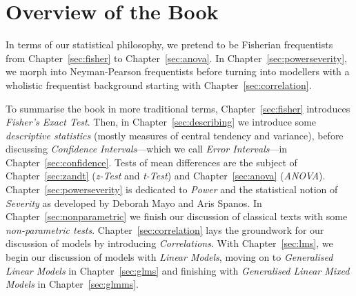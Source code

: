 %
%
%
%
%
%

\section{Overview of the Book}\label{sec:overview}

In terms of our statistical philosophy, we pretend to be Fisherian frequentists from Chapter~\ref{sec:fisher} to Chapter~\ref{sec:anova}.
In Chapter~\ref{sec:powerseverity}, we morph into Neyman-Pearson frequentists before turning into modellers with a wholistic frequentist background starting with Chapter~\ref{sec:correlation}.

To summarise the book in more traditional terms, Chapter~\ref{sec:fisher} introduces \textit{Fisher's Exact Test}.
Then, in Chapter~\ref{sec:describing} we introduce some \textit{descriptive statistics} (mostly measures of central tendency and variance), before discussing \textit{Confidence Intervals}---which we call \textit{Error Intervals}---in Chapter~\ref{sec:confidence}.
Tests of mean differences are the subject of Chapter~\ref{sec:zandt} (\textit{z-Test} and \textit{t-Test}) and Chapter~\ref{sec:anova} (\textit{ANOVA}).
Chapter~\ref{sec:powerseverity} is dedicated to \textit{Power} and the statistical notion of \textit{Severity} as developed by Deborah Mayo and Aris Spanos.
In Chapter~\ref{sec:nonparametric} we finish our discussion of classical texts with some \textit{non-parametric tests}.
Chapter~\ref{sec:correlation} lays the groundwork for our discussion of models by introducing \textit{Correlations}.
With Chapter~\ref{sec:lms}, we begin our discussion of models with \textit{Linear Models}, moving on to \textit{Generalised Linear Models} in Chapter~\ref{sec:glms} and finishing with \textit{Generalised Linear Mixed Models} in Chapter~\ref{sec:glmms}.



